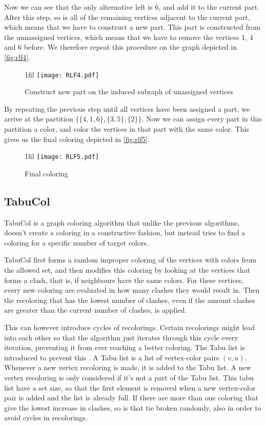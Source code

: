 \documentclass[a4paper]{article}
\makeatletter
\newcommand*{\centerfloat}{%
  \parindent \z@
  \leftskip \z@ \@plus 1fil \@minus \textwidth
  \rightskip\leftskip
  \parfillskip \z@skip}
\makeatother
\begin{document}
Now we can see that the only alternative left is 6, and add it to the current
part. After this step, so is all of the remaining vertices adjacent to the
current part, which means that we have to construct a new part. This part is
constructed from the unnassigned vertices, which means that we have to remove
the vertices  1, 4 and 6 before. We therefore repeat this procedure on the graph 
depicted in \autoref{fig:rlf4}.

\begin{figure}[H]
    \centerfloat
    \texttt{[image: RLF4.pdf]}
    \caption{Construct new part on the induced subraph of unassigned vertices}
    \label{fig:rlf4}
\end{figure}

By repeating the previous step until all vertices have been assigned a part, we 
arrive at the partition $\{\{4,1,6\},\{3,5\},\{2\}\}$. Now we can assign every
part in this partition a color, and color the vertices in that part with the same color. 
This gives us the final coloring depicted in \autoref{fig:rlf5}.

\begin{figure}[H]
    \centerfloat
    \texttt{[image: RLF5.pdf]}
    \caption{Final coloring}
    \label{fig:rlf5}
\end{figure}



\subsection{TabuCol}

TabuCol is a graph coloring algorithm that unlike the previous algorithms, doesn't
create a coloring in a constructive fashion, but instead tries to find a
coloring for a specific number of target colors.

TabuCol first forms a random improper coloring of the vertices with colors from
the allowed set, and then modifies this coloring by looking at the vertices that
forms a clash, that is, if neighbours have the same colors. For these vertices,
every new coloring are evaluated in how many clashes they would result in. 
Then the recoloring that has the lowest number of clashes, even if the amount
clashes are greater than the current number of clashes, is applied.

This can however introduce cycles of recolorings. Certain recolorings might
lead into each other so that the algorithm just iterates through this cycle
every iteration, preventing it from ever reaching a better coloring. The Tabu
list is introduced to prevent this . A Tabu list is a list of vertex-color
pairs $(v,u)$. Whenever a new vertex recoloring is made, it is added to the
Tabu list. A new vertex recoloring is only considered if it's not a part of the
Tabu list. This tabu list have a set size, so that the first element is removed
when a new vertex-color pair is added and the list is already full. If there
are more than one coloring that give the lowest increase in clashes, so is that
tie broken randomly, also in order to avoid cycles in recolorings.
\end{document}
